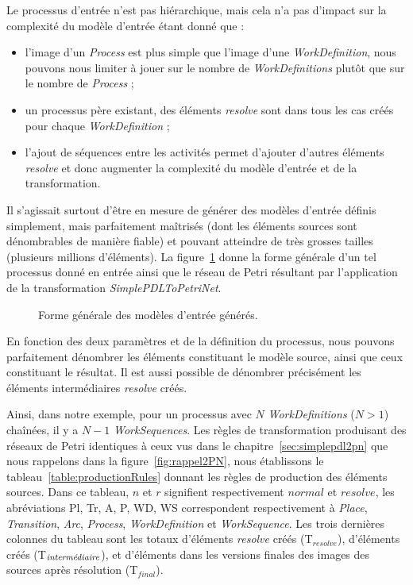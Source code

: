 Le processus d'entrée n'est pas hiérarchique, mais cela n'a pas d'impact sur la
complexité du modèle d'entrée étant donné que :
\begin{itemize}
  \item l'image d'un \emph{Process} est plus simple que l'image d'une
    \emph{WorkDefinition}, nous pouvons nous limiter à jouer sur le nombre de
    \emph{WorkDefinitions} plutôt que sur le nombre de \emph{Process} ;
  \item un processus père existant, des éléments \emph{resolve} sont dans tous
    les cas créés pour chaque \emph{WorkDefinition} ;
  \item l'ajout de séquences entre les activités permet d'ajouter d'autres
    éléments \emph{resolve} et donc augmenter la complexité du modèle d'entrée
    et de la transformation. 
\end{itemize}

Il s'agissait surtout d'être en mesure de générer des modèles d'entrée définis
simplement, mais parfaitement maîtrisés (dont les éléments sources sont
dénombrables de manière fiable) et pouvant atteindre de très grosses tailles
(plusieurs millions d'éléments). La figure~\ref{fig:inputModel} donne la forme
générale d'un tel processus donné en entrée ainsi que le réseau de Petri
résultant par l'application de la transformation \emph{SimplePDLToPetriNet}.

\begin{figure}[h]
  \begin{center}
      
      \caption{Forme générale des modèles d'entrée générés.}
      \label{fig:inputModel}
  \end{center}
\end{figure}

En fonction des deux paramètres et de la définition du processus, nous pouvons
parfaitement dénombrer les éléments constituant le modèle source, ainsi que
ceux constituant le résultat. Il est aussi possible de dénombrer précisément
les éléments intermédiaires \emph{resolve} créés.

Ainsi, dans notre exemple, pour un processus avec $N$ \emph{WorkDefinitions}
($N>1$) chaînées, il y a $N-1$ \emph{WorkSequences}. Les règles de
transformation produisant des réseaux de Petri identiques à ceux vus dans le
chapitre~\ref{sec:simplepdl2pn} que nous rappelons dans la
figure~\ref{fig:rappel2PN}, nous établissons le
tableau~\ref{table:productionRules} donnant les règles de production des
éléments sources. Dans ce tableau, $n$ et $r$ signifient respectivement
$normal$ et $resolve$, les abréviations Pl, Tr, A, P, WD, WS correspondent
respectivement à \emph{Place}, \emph{Transition}, \emph{Arc}, \emph{Process},
\emph{WorkDefinition} et \emph{WorkSequence}. Les trois dernières colonnes du
tableau sont les totaux d'éléments \emph{resolve} créés (T$_{resolve}$),
d'éléments créés (T$_{\text{\textit{intermédiaire}}}$), et d'éléments dans les
versions finales des images des sources après résolution (T$_{final}$).


